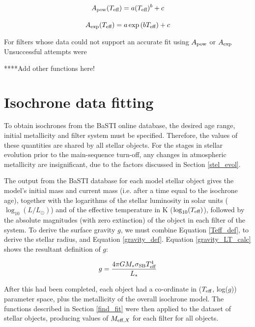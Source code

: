 \documentclass[12pt, a4paper]{report}
\begin{document}
\begin{equation}
A_{\textnormal{pow}} (T_{\textnormal{eff}}) = a (T_{\textnormal{eff}})^{b} + c
\label{Teff_pow}
\end{equation}

\begin{equation}
A_{\textnormal{exp}} (T_{\textnormal{eff}}) = a \exp{(b T_{\textnormal{eff}})} + c
\label{Teff_exp}
\end{equation}

For filters whose data could not support an accurate fit using $A_{\textnormal{pow}}$ or $A_{\textnormal{exp}}$
Unsuccessful attempts were

****Add other functions here!

\section{Isochrone data fitting}
To obtain isochrones from the BaSTI online database, the desired age range, initial metallicity and filter system must be specified. Therefore, the values of these quantities are shared by all stellar objects. For the stages in stellar evolution prior to the main-sequence turn-off, any changes in atmospheric metallicity are insignificant, due to the factors discussed in Section \ref{stel_evol}.

The output from the BaSTI database for each model stellar object gives the model's initial mass and current mass (i.e. after a time equal to the isochrone age), together with the logarithms of the stellar luminosity in solar units ($\log_{10}(L/L_{\odot})$) and of the effective temperature in K ($\log_{10}(T_{\textnormal{eff}})$), followed by the absolute magnitudes (with zero extinction) of the object in each filter of the system. To derive the surface gravity $g$, we must combine Equation \ref{Teff_def}, to derive the stellar radius, and Equation \ref{gravity_def}. Equation \ref{gravity_LT_calc} shows the resultant definition of $g$:

\begin{equation}
\label{gravity_LT_calc}
g = \frac{4 \pi G M_{*} \sigma_{\textnormal{SB}} T_{\textnormal{eff}}^{4}}{L_{*}}
\end{equation}

After this had been completed, each object had a co-ordinate in ($T_{\textnormal{eff}}$, log($g$)) parameter space, plus the metallicity of the overall isochrone model. The functions described in Section \ref{find_fit} were then applied to the dataset of stellar objects, producing values of $M_{\textnormal{eff},X}$ for each filter for all objects.
\end{document}
